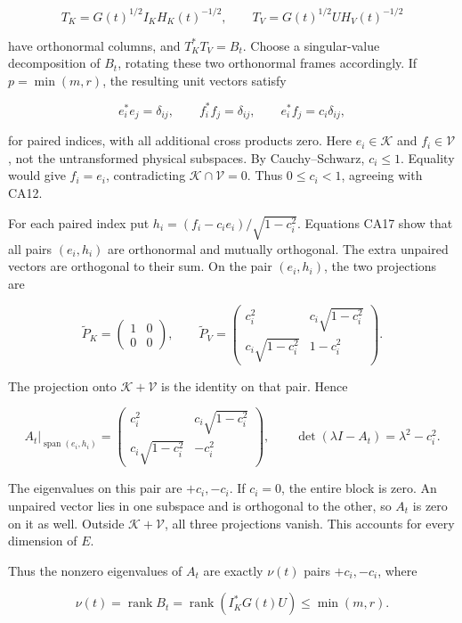 \documentclass[11pt]{article}
\begin{document}
\[
T_K=G(t)^{1/2}I_KH_K(t)^{-1/2},
\qquad T_V=G(t)^{1/2}UH_V(t)^{-1/2}
\]

have orthonormal columns, and \(T_K^*T_V=B_t\). Choose a singular-value decomposition of \(B_t\), rotating these two orthonormal frames accordingly. If \(p=\min(m,r)\), the resulting unit vectors satisfy

\[
e_i^*e_j=\delta_{ij},\qquad f_i^*f_j=\delta_{ij},
\qquad e_i^*f_j=c_i\delta_{ij},
\tag{CA17}
\]

for paired indices, with all additional cross products zero. Here \(e_i\in\mathcal K\) and \(f_i\in\mathcal V\), not the untransformed physical subspaces. By Cauchy--Schwarz, \(c_i\le1\). Equality would give \(f_i=e_i\), contradicting \(\mathcal K\cap\mathcal V=0\). Thus \(0\le c_i<1\), agreeing with CA12.

For each paired index put \(h_i=(f_i-c_ie_i)/\sqrt{1-c_i^2}\). Equations CA17 show that all pairs \((e_i,h_i)\) are orthonormal and mutually orthogonal. The extra unpaired vectors are orthogonal to their sum. On the pair \((e_i,h_i)\), the two projections are

\[
\widetilde P_K=\begin{pmatrix}1&0\\0&0\end{pmatrix},
\qquad
\widetilde P_V=\begin{pmatrix}c_i^2&c_i\sqrt{1-c_i^2}\\
c_i\sqrt{1-c_i^2}&1-c_i^2\end{pmatrix}.
\]

The projection onto \(\mathcal K+\mathcal V\) is the identity on that pair. Hence

\[
A_t\big|_{\operatorname{span}(e_i,h_i)}
=\begin{pmatrix}c_i^2&c_i\sqrt{1-c_i^2}\\
c_i\sqrt{1-c_i^2}&-c_i^2\end{pmatrix},
\qquad \det(\lambda I-A_t)=\lambda^2-c_i^2.
\tag{CA18}
\]

The eigenvalues on this pair are \(+c_i,-c_i\). If \(c_i=0\), the entire block is zero. An unpaired vector lies in one subspace and is orthogonal to the other, so \(A_t\) is zero on it as well. Outside \(\mathcal K+\mathcal V\), all three projections vanish. This accounts for every dimension of \(E\).

Thus the nonzero eigenvalues of \(A_t\) are exactly \(\nu(t)\) pairs \(+c_i,-c_i\), where

\[
\nu(t)=\operatorname{rank}B_t
=\operatorname{rank}(I_K^*G(t)U)\le\min(m,r).
\tag{CA19}
\]
\end{document}
